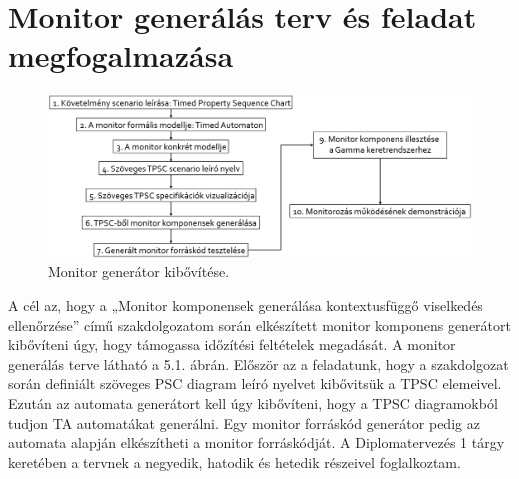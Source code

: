 \chapter{Monitor generálás terv és feladat megfogalmazása}

\begin{figure}[!ht]
    \centering
    \includegraphics[width=150mm, keepaspectratio]{figures/generation_plan.png}
    \caption{Monitor generátor kibővítése.}
\end{figure}

A cél az, hogy a „Monitor komponensek generálása kontextusfüggő viselkedés ellenőrzése” című szakdolgozatom során elkészített monitor komponens generátort kibővíteni úgy, hogy támogassa időzítési feltételek megadását.
A monitor generálás terve látható a 5.1. ábrán.
Először az a feladatunk, hogy a szakdolgozat során definiált szöveges PSC diagram leíró nyelvet kibővitsük a TPSC elemeivel.
Ezután az automata generátort kell úgy kibővíteni, hogy a TPSC diagramokból tudjon TA automatákat generálni.
Egy monitor forráskód generátor pedig az automata alapján elkészítheti a monitor forráskódját.
A Diplomatervezés 1 tárgy keretében a tervnek a negyedik, hatodik és hetedik részeivel foglalkoztam.